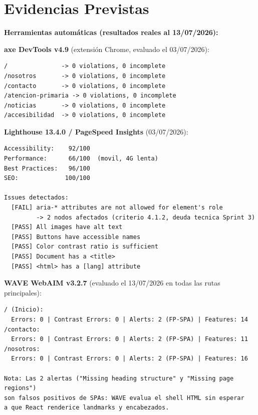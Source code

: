 \documentclass[12pt, a4paper]{article}
\begin{document}
\section{Evidencias Previstas}

\textbf{Herramientas automáticas (resultados reales al 13/07/2026):}

\medskip
\textbf{axe DevTools v4.9} (extensión Chrome, evaluado el 03/07/2026):
\begin{lstlisting}[language={}, caption={Resumen axe DevTools -- todas las páginas}]
/               -> 0 violations, 0 incomplete
/nosotros       -> 0 violations, 0 incomplete
/contacto       -> 0 violations, 0 incomplete
/atencion-primaria -> 0 violations, 0 incomplete
/noticias       -> 0 violations, 0 incomplete
/accesibilidad  -> 0 violations, 0 incomplete
\end{lstlisting}

\textbf{Lighthouse 13.4.0 / PageSpeed Insights} (03/07/2026):
\begin{lstlisting}[language={}, caption={Salida Lighthouse -- PageSpeed Insights (movil)}]
Accessibility:    92/100
Performance:      66/100  (movil, 4G lenta)
Best Practices:   96/100
SEO:             100/100

Issues detectados:
  [FAIL] aria-* attributes are not allowed for element's role
         -> 2 nodos afectados (criterio 4.1.2, deuda tecnica Sprint 3)
  [PASS] All images have alt text
  [PASS] Buttons have accessible names
  [PASS] Color contrast ratio is sufficient
  [PASS] Document has a <title>
  [PASS] <html> has a [lang] attribute
\end{lstlisting}

\textbf{WAVE WebAIM v3.2.7} (evaluado el 13/07/2026 en todas las rutas principales):
\begin{lstlisting}[language={}, caption={Salida WAVE por ruta}]
/ (Inicio):
  Errors: 0 | Contrast Errors: 0 | Alerts: 2 (FP-SPA) | Features: 14
/contacto:
  Errors: 0 | Contrast Errors: 0 | Alerts: 2 (FP-SPA) | Features: 11
/nosotros:
  Errors: 0 | Contrast Errors: 0 | Alerts: 2 (FP-SPA) | Features: 16

Nota: Las 2 alertas ("Missing heading structure" y "Missing page regions")
son falsos positivos de SPAs: WAVE evalua el shell HTML sin esperar
a que React renderice landmarks y encabezados.
\end{lstlisting}
\end{document}
